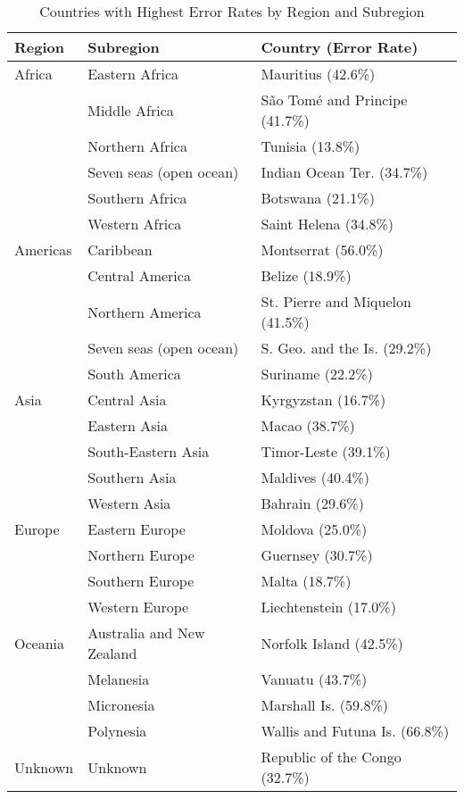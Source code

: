 \begin{table}[h]
\centering
\caption{Countries with Highest Error Rates by Region and Subregion}
\label{tab:error_rates}
\begin{tabular}{lll}
\toprule
Region & Subregion & Country (Error Rate) \\
\midrule
Africa & Eastern Africa & Mauritius (42.6\%) \\
 & Middle Africa & São Tomé and Principe (41.7\%) \\
 & Northern Africa & Tunisia (13.8\%) \\
 & Seven seas (open ocean) & Indian Ocean Ter. (34.7\%) \\
 & Southern Africa & Botswana (21.1\%) \\
 & Western Africa & Saint Helena (34.8\%) \\
\midrule
Americas & Caribbean & Montserrat (56.0\%) \\
 & Central America & Belize (18.9\%) \\
 & Northern America & St. Pierre and Miquelon (41.5\%) \\
 & Seven seas (open ocean) & S. Geo. and the Is. (29.2\%) \\
 & South America & Suriname (22.2\%) \\
\midrule
Asia & Central Asia & Kyrgyzstan (16.7\%) \\
 & Eastern Asia & Macao (38.7\%) \\
 & South-Eastern Asia & Timor-Leste (39.1\%) \\
 & Southern Asia & Maldives (40.4\%) \\
 & Western Asia & Bahrain (29.6\%) \\
\midrule
Europe & Eastern Europe & Moldova (25.0\%) \\
 & Northern Europe & Guernsey (30.7\%) \\
 & Southern Europe & Malta (18.7\%) \\
 & Western Europe & Liechtenstein (17.0\%) \\
\midrule
Oceania & Australia and New Zealand & Norfolk Island (42.5\%) \\
 & Melanesia & Vanuatu (43.7\%) \\
 & Micronesia & Marshall Is. (59.8\%) \\
 & Polynesia & Wallis and Futuna Is. (66.8\%) \\
\midrule
Unknown & Unknown & Republic of the Congo (32.7\%) \\
\bottomrule
\end{tabular}
\end{table}
